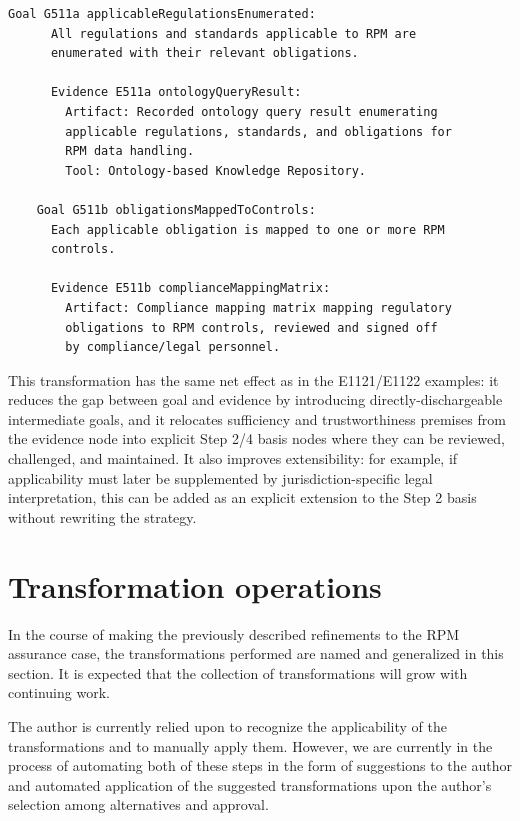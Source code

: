 \documentclass{article}
\begin{document}
\begin{Verbatim}[commandchars=\\\{\}]
    Goal G511a applicableRegulationsEnumerated:
      All regulations and standards applicable to RPM are
      enumerated with their relevant obligations.

      Evidence E511a ontologyQueryResult:
        Artifact: Recorded ontology query result enumerating
        applicable regulations, standards, and obligations for
        RPM data handling.
        Tool: Ontology-based Knowledge Repository.

    Goal G511b obligationsMappedToControls:
      Each applicable obligation is mapped to one or more RPM
      controls.

      Evidence E511b complianceMappingMatrix:
        Artifact: Compliance mapping matrix mapping regulatory
        obligations to RPM controls, reviewed and signed off
        by compliance/legal personnel.
\end{Verbatim}

This transformation has the same net effect as in the E1121/E1122 examples: it reduces the gap between goal and evidence by introducing directly-dischargeable intermediate goals, and it relocates sufficiency and trustworthiness premises from the evidence node into explicit Step 2/4 basis nodes where they can be reviewed, challenged, and maintained. It also improves extensibility: for example, if applicability must later be supplemented by jurisdiction-specific legal interpretation, this can be added as an explicit extension to the Step 2 basis without rewriting the strategy.


\clearpage
\section{Transformation operations}

In the course of making the previously described refinements to the RPM assurance case, the transformations performed are named and generalized in this section.
It is expected that the collection of transformations will grow with continuing work.

The author is currently relied upon to recognize the applicability of the transformations and to manually apply them.
However, we are currently in the process of automating both of these steps in the form of suggestions to the author and automated application of the suggested transformations upon the author's selection among alternatives and approval.
\end{document}
